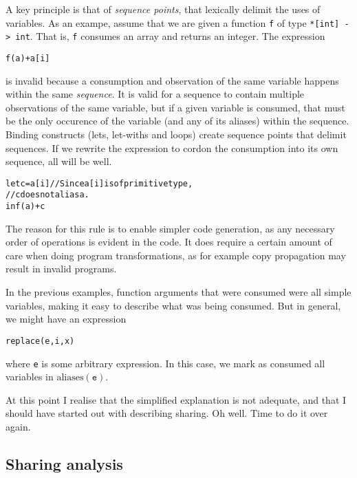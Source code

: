 \documentclass[oneside]{memoir}
\newcommand\aliases[1]{\textrm{aliases}(#1)}
\begin{document}
A key principle is that of \textit{sequence points}, that lexically
delimit the uses of variables.  As an exampe, assume that we
are given a function \texttt{f} of type \texttt{*[int] -> int}.  That
is, \texttt{f} consumes an array and returns an integer.  The expression
\begin{alltt}
  f(a) + a[i]
\end{alltt}
is invalid because a consumption and observation of the same variable
happens within the same \textit{sequence}.  It is valid for a sequence
to contain multiple observations of the same variable, but if a given
variable is consumed, that must be the only occurence of the variable
(and any of its aliases) within the sequence.  Binding constructs
(lets, let-withs and loops) create sequence points that delimit
sequences.  If we rewrite the expression to cordon the consumption
into its own sequence, all will be well.
\begin{alltt}
  let c = a[i] // Since a[i] is of primitive type,
               // c does not alias a.
  in f(a) + c
\end{alltt}

The reason for this rule is to enable simpler code generation, as any
necessary order of operations is evident in the code.  It does require
a certain amount of care when doing program transformations, as for
example copy propagation may result in invalid programs.

In the previous examples, function arguments that were consumed were
all simple variables, making it easy to describe what was being
consumed.  But in general, we might have an expression
\begin{alltt}
  replace(e, i, x)
\end{alltt}
where \texttt{e} is some arbitrary expression.  In this case, we mark
as consumed all variables in $\aliases{\texttt{e}}$.

At this point I realise that the simplified explanation is not
adequate, and that I should have started out with describing sharing.
Oh well.  Time to do it over again.

\subsection{Sharing analysis}
\label{subsec:l0-sharing}
\end{document}

